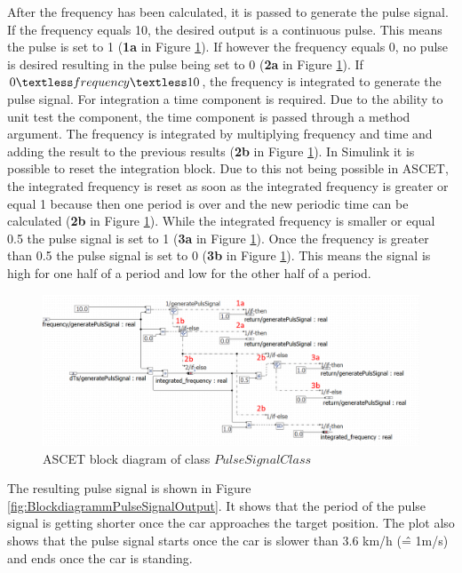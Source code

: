 After the frequency has been calculated, it is passed to generate the pulse signal. If the frequency equals 10, the desired output is a continuous pulse. This means the pulse is set to 1 (\textbf{1a} in Figure \ref{fig:BlockdiagrammPulseSignal}). If however the frequency equals 0, no pulse is desired resulting in the pulse being set to 0 (\textbf{2a} in Figure \ref{fig:BlockdiagrammPulseSignal}). If $0 \textless frequency \textless 10$, the frequency is integrated to generate the pulse signal. For integration a time component is required. Due to the ability to unit test the component, the time component is passed through a method argument. The frequency is integrated by multiplying frequency and time and adding the result to the previous results (\textbf{2b} in Figure \ref{fig:BlockdiagrammPulseSignal}). In Simulink it is possible to reset the integration block. Due to this not being possible in ASCET, the integrated frequency is reset as soon as the integrated frequency is greater or equal 1 because then one period is over and the new periodic time can be calculated (\textbf{2b} in Figure \ref{fig:BlockdiagrammPulseSignal}).  
While the integrated frequency is smaller or equal 0.5 the pulse signal is set to 1 (\textbf{3a} in Figure \ref{fig:BlockdiagrammPulseSignal}). Once the frequency is greater than 0.5 the pulse signal is set to 0 (\textbf{3b} in Figure \ref{fig:BlockdiagrammPulseSignal}). This means the signal is high for one half of a period and low for the other half of a period.

\begin{figure}[H]
\centering
\includegraphics[width=1\textwidth]{images/Blockdiagramm_PulseSignalClassAnno.png}
\caption{ASCET block diagram of class $PulseSignalClass$}
\label{fig:BlockdiagrammPulseSignal}
\end{figure}

The resulting pulse signal is shown in Figure \ref{fig:BlockdiagrammPulseSignalOutput}. It shows that the period of the pulse signal is getting shorter once the car approaches the target position. The plot also shows that the pulse signal starts once the car is slower than 3.6 km/h (\^= 1m/s) and ends once the car is standing. 

